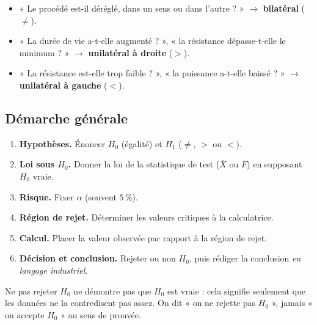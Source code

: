 \documentclass[a4paper,11pt]{article}
\begin{document}
\begin{methode}
\begin{itemize}
  \item « Le procédé est-il déréglé, dans un sens ou dans l'autre ? » $\rightarrow$ \textbf{bilatéral} ($\neq$).
  \item « La durée de vie a-t-elle augmenté ? », « la résistance dépasse-t-elle le minimum ? » $\rightarrow$ \textbf{unilatéral à droite} ($>$).
  \item « La résistance est-elle trop faible ? », « la puissance a-t-elle baissé ? » $\rightarrow$ \textbf{unilatéral à gauche} ($<$).
\end{itemize}
\end{methode}

\subsection{Démarche générale}

\begin{methode}
\begin{enumerate}
  \item \textbf{Hypothèses.} Énoncer $H_0$ (égalité) et $H_1$ ($\neq$, $>$ ou $<$).
  \item \textbf{Loi sous $H_0$.} Donner la loi de la statistique de test ($\overline{X}$ ou $F$) en supposant $H_0$ vraie.
  \item \textbf{Risque.} Fixer $\alpha$ (souvent $5\,\%$).
  \item \textbf{Région de rejet.} Déterminer les valeurs critiques à la calculatrice.
  \item \textbf{Calcul.} Placer la valeur observée par rapport à la région de rejet.
  \item \textbf{Décision et conclusion.} Rejeter ou non $H_0$, puis rédiger la conclusion \emph{en langage industriel}.
\end{enumerate}
\end{methode}

\begin{remarque}
Ne pas rejeter $H_0$ ne démontre pas que $H_0$ est vraie : cela signifie seulement que les données ne la contredisent pas assez. On dit « on ne rejette pas $H_0$ », jamais « on accepte $H_0$ » au sens de prouvée.
\end{remarque}

\newpage
\end{document}
